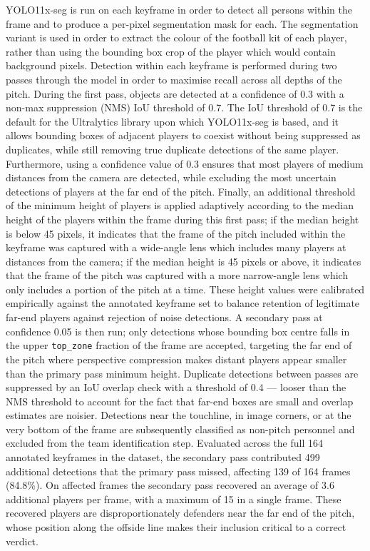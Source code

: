 YOLO11x-seg is run on each keyframe in order to detect all persons within the frame and to produce a per-pixel segmentation mask for each. The segmentation variant is used in order to extract the colour of the football kit of each player, rather than using the bounding box crop of the player which would contain background pixels. Detection within each keyframe is performed during two passes through the model in order to maximise recall across all depths of the pitch. During the first pass, objects are detected at a confidence of 0.3 with a non-max suppression (NMS) IoU threshold of 0.7. The IoU threshold of 0.7 is the default for the Ultralytics library upon which YOLO11x-seg is based, and it allows bounding boxes of adjacent players to coexist without being suppressed as duplicates, while still removing true duplicate detections of the same player. Furthermore, using a confidence value of 0.3 ensures that most players of medium distances from the camera are detected, while excluding the most uncertain detections of players at the far end of the pitch. Finally, an additional threshold of the minimum height of players is applied adaptively according to the median height of the players within the frame during this first pass; if the median height is below 45 pixels, it indicates that the frame of the pitch included within the keyframe was captured with a wide-angle lens which includes many players at distances from the camera; if the median height is 45 pixels or above, it indicates that the frame of the pitch was captured with a more narrow-angle lens which only includes a portion of the pitch at a time. These height values were calibrated empirically against the annotated keyframe set to balance retention of legitimate far-end players against rejection of noise detections. A secondary pass at confidence 0.05 is then run; only detections whose bounding box centre falls in the upper \texttt{top\_zone} fraction of the frame are accepted, targeting the far end of the pitch where perspective compression makes distant players appear smaller than the primary pass minimum height. Duplicate detections between passes are suppressed by an IoU overlap check with a threshold of 0.4 --- looser than the NMS threshold to account for the fact that far-end boxes are small and overlap estimates are noisier. Detections near the touchline, in image corners, or at the very bottom of the frame are subsequently classified as non-pitch personnel and excluded from the team identification step. Evaluated across the full 164 annotated keyframes in the dataset, the secondary pass contributed 499 additional detections that the primary pass missed, affecting 139 of 164 frames (84.8\%). On affected frames the secondary pass recovered an average of 3.6 additional players per frame, with a maximum of 15 in a single frame. These recovered players are disproportionately defenders near the far end of the pitch, whose position along the offside line makes their inclusion critical to a correct verdict.

